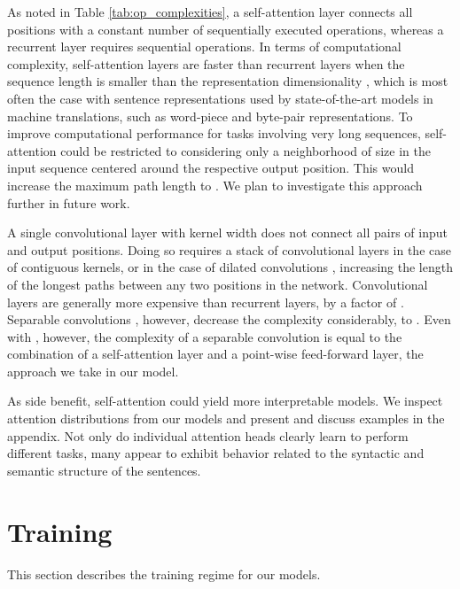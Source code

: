 \documentclass{article}
\begin{document}
As noted in Table \ref{tab:op_complexities}, a self-attention layer connects all positions with a constant number of sequentially executed operations, whereas a recurrent layer requires  sequential operations.
In terms of computational complexity, self-attention layers are faster than recurrent layers when the sequence length  is smaller than the representation dimensionality , which is most often the case with sentence representations used by state-of-the-art models in machine translations, such as word-piece \citep{wu2016google} and byte-pair \citep{sennrich2015neural} representations.
To improve computational performance for tasks involving very long sequences, self-attention could be restricted to considering only a neighborhood of size  in the input sequence centered around the respective output position. This would increase the maximum path length to . We plan to investigate this approach further in future work.

A single convolutional layer with kernel width  does not connect all pairs of input and output positions. Doing so requires a stack of  convolutional layers in the case of contiguous kernels, or  in the case of dilated convolutions \citep{NalBytenet2017}, increasing the length of the longest paths between any two positions in the network.
Convolutional layers are generally more expensive than recurrent layers, by a factor of . Separable convolutions \citep{xception2016}, however, decrease the complexity considerably, to . Even with , however, the complexity of a separable convolution is equal to the combination of a self-attention layer and a point-wise feed-forward layer, the approach we take in our model.







As side benefit, self-attention could yield more interpretable models. We inspect attention distributions from our models and present and discuss examples in the appendix. Not only do individual attention heads clearly learn to perform different tasks, many appear to exhibit behavior related to the syntactic and semantic structure of the sentences.

 
\section{Training}
This section describes the training regime for our models. 
\end{document}
